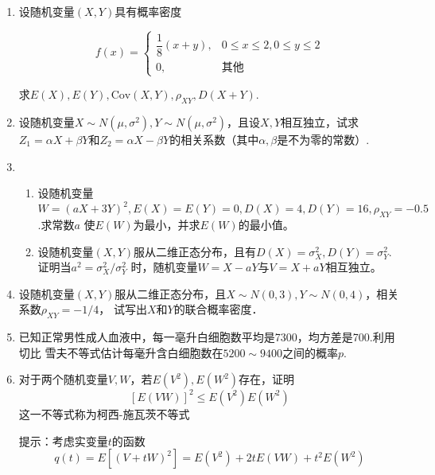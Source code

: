 \documentclass[10pt,a4paper]{article}
\begin{document}
\begin{enumerate}
    \item 设随机变量$(X,Y)$具有概率密度
    \vspace{-0.5cm}
    \begin{spacing}{2.0}
    $$f(x)=\left\{\begin{array}{ll}
        \dfrac{1}{8}(x+y), & 0\leq x\leq 2,0\leq y \leq 2\\
        0, & \mbox{其他}
    \end{array}\right.$$
    \end{spacing}
    \vspace{-0.5cm}
    求$E(X),E(Y),\mathrm{Cov}(X,Y),\rho_{XY},D(X+Y)$.
    \vspace{10cm}


    \item 设随机变量$X\sim N(\mu,\sigma^2),Y\sim N(\mu,\sigma^2)$，且设$X,Y$相互独立，试求
    $Z_1=\alpha X+\beta Y$和$Z_2=\alpha X-\beta Y$的相关系数（其中$\alpha,\beta$是不为零的常数）.
    \vspace{10.5cm}

    \item \begin{enumerate}
        \item 设随机变量$W=(aX+3Y)^2,E(X)=E(Y)=0,D(X)=4,D(Y)=16,\rho_{XY}=-0.5$.求常数$a$
        使$E(W)$为最小，并求$E(W)$的最小值。
        \item 设随机变量$(X,Y)$服从二维正态分布，且有$D(X)=\sigma_X^2,D(Y)=\sigma_Y^2$.证明当$a^2=\sigma^2_X/\sigma^2_Y$
        时，随机变量$W=X-aY$与$V=X+aY$相互独立。
    \end{enumerate}
    \vspace{10.5cm}


    \item 设随机变量$(X,Y)$服从二维正态分布，且$X\sim N(0,3),Y\sim N(0,4)$，相关系数$\rho_{XY}=-1/4$，
    试写出$X$和$Y$的联合概率密度．
    \vspace{10.5cm}
    
    
    \item 已知正常男性成人血液中，每一亳升白细胞数平均是7300，均方差是700.利用切比
    雪夫不等式估计每毫升含白细胞数在$5200\sim 9400$之间的概率$p$.
    \vspace{10.5cm}
    
    \item 对于两个随机变量$V,W$，若$E(V^2),E(W^2)$存在，证明
    $$[E(VW)]^2\leq E(V^2)E(W^2)$$
    这一不等式称为柯西-施瓦茨不等式
    \par 提示：考虑实变量$t$的函数
    $$q(t)=E[(V+tW)^2]=E(V^2)+2tE(VW)+t^2E(W^2)$$
    \vspace{10cm}




  

\end{enumerate}
\end{document}

